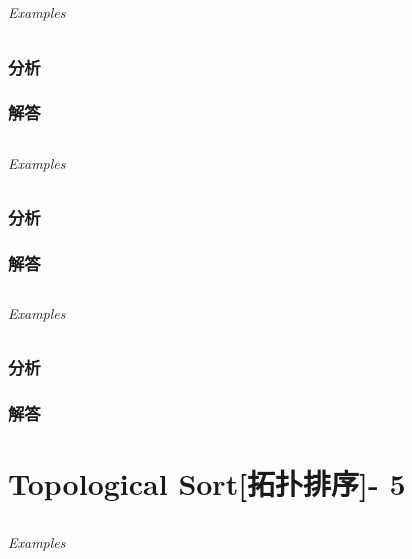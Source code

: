 \documentclass[UTF8,a4paper,12pt]{ctexbook}
\begin{document}
\section{}
	
	\subparagraph{Examples}
	
	\subsection{分析}
	
	\subsection{解答}
	
\section{}
	
	\subparagraph{Examples}
	
	\subsection{分析}
	
	\subsection{解答}
	
\section{}
	
	\subparagraph{Examples}
	
	\subsection{分析}
	
	\subsection{解答}
\chapter{Topological Sort[拓扑排序]- 5}
\section{}
	
	\subparagraph{Examples}
	
\end{document}
